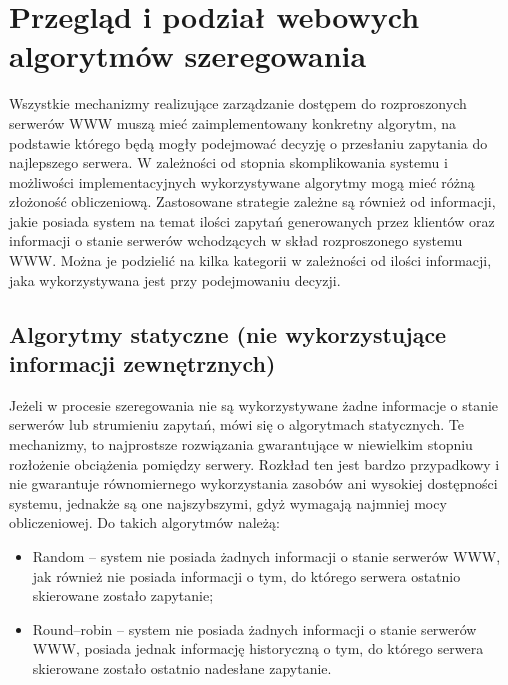 \section{Przegląd i podział webowych algorytmów szeregowania}

Wszystkie mechanizmy realizujące zarządzanie dostępem do rozproszonych serwerów WWW muszą mieć zaimplementowany konkretny 
algorytm, na podstawie którego będą mogły podejmować decyzję o przesłaniu zapytania do najlepszego serwera. W zależności od 
stopnia skomplikowania systemu i możliwości implementacyjnych wykorzystywane algorytmy mogą mieć różną złożoność obliczeniową. 
Zastosowane strategie zależne są również od informacji, jakie posiada system na temat ilości zapytań generowanych przez 
klientów oraz informacji o stanie serwerów wchodzących w skład rozproszonego systemu WWW. Można je podzielić na kilka 
kategorii w zależności od ilości informacji, jaka wykorzystywana jest przy podejmowaniu decyzji. 

\subsection{Algorytmy statyczne (nie wykorzystujące informacji zewnętrznych)}
Jeżeli w procesie szeregowania nie są wykorzystywane żadne informacje o stanie serwerów lub strumieniu zapytań, mówi się o 
algorytmach statycznych. Te mechanizmy, to najprostsze rozwiązania gwarantujące w niewielkim stopniu rozłożenie obciążenia 
pomiędzy serwery. Rozkład ten jest bardzo przypadkowy i nie gwarantuje równomiernego wykorzystania zasobów ani wysokiej 
dostępności systemu, jednakże są one najszybszymi, gdyż wymagają najmniej mocy obliczeniowej. Do takich algorytmów należą:
\begin{itemize}
\item Random -- system nie posiada żadnych informacji o stanie serwerów WWW, jak również nie posiada informacji o tym, do 
którego serwera ostatnio skierowane zostało zapytanie;
\item Round--robin -- system nie posiada żadnych informacji o stanie serwerów WWW, posiada jednak informację historyczną o tym, 
do którego serwera skierowane zostało ostatnio nadesłane zapytanie.
\end{itemize}

